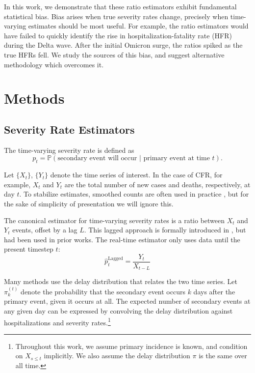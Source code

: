 \documentclass{article}
\begin{document}
In this work, we demonstrate that these ratio estimators exhibit fundamental statistical bias. Bias arises when true severity rates change, precisely when time-varying estimates should be most useful. For example, the ratio estimators would have failed to quickly identify the rise in hospitalization-fatality rate (HFR) during the Delta wave. After the initial Omicron surge, the ratios spiked as the true HFRs fell. We study the sources of this bias, and suggest alternative methodology which overcomes it.


\section{Methods}
\subsection{Severity Rate Estimators}

The time-varying severity rate is defined as
\begin{equation}\label{eq:severity}
    p_t = \mathbb{P}(\text{secondary event will occur } \vert \text{ primary event at time }t).
\end{equation}

Let $\{X_t\}$, $\{Y_t\}$ denote the time series of interest. In the case of CFR, for example, $X_t$ and $Y_t$ are the total number of new cases and deaths, respectively, at day $t$. To stabilize estimates, smoothed counts are often used in practice \cite{germany,timevar_ifr,LIU2023100350}, but for the sake of simplicity of presentation we will ignore this. 

The canonical estimator for time-varying severity rates is a ratio between $X_t$ and $Y_t$ events, offset by a lag $L$. This lagged approach is formally introduced in \citeauthor{thomas2021estimating}, but had been used in prior works. The real-time estimator only uses data until the present timestep $t$: 
\begin{equation}\label{eq:lagged}
    \hat{p}_t^{\text{Lagged}} = \frac{Y_t}{X_{t-L}}
\end{equation}


Many methods use the delay distribution that relates the two time series. Let $\pi_k^{(t)}$ denote the probability that the secondary event occurs $k$ days after the primary event, given it occurs at all. The expected number of secondary events at any given day can be expressed by convolving the delay distribution against hospitalizations and severity rates.\footnote{Throughout this work, we assume primary incidence is known, and condition on $X_{s\leq t}$ implicitly. We also assume the delay distribution $\pi$ is the same over all time.}
\end{document}
